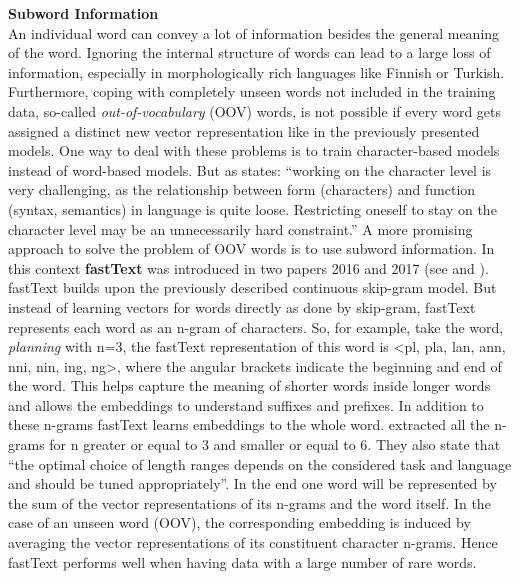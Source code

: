 \documentclass[]{krantz}
\begin{document}
\textbf{Subword Information}\\
An individual word can convey a lot of information besides the general meaning of the word. Ignoring the internal structure of words can lead to a large loss of information, especially in morphologically rich languages like Finnish or Turkish. Furthermore, coping with completely unseen words not included in the training data, so-called \emph{out-of-vocabulary} (OOV) words, is not possible if every word gets assigned a distinct new vector representation like in the previously presented models. One way to deal with these problems is to train character-based models instead of word-based models. But as \citet{goldberg2016primer} states: ``working on the character level is very challenging, as the relationship between form (characters) and function (syntax, semantics) in language is quite loose. Restricting oneself to stay on the character level may be an unnecessarily hard constraint.'' A more promising approach to solve the problem of OOV words is to use subword information. In this context \textbf{fastText} was introduced in two papers 2016 and 2017 (see \citet{joulin2016bag} and \citet{bojanowski2017enriching}). fastText builds upon the previously described continuous skip-gram model. But instead of learning vectors for words directly as done by skip-gram, fastText represents each word as an n-gram of characters. So, for example, take the word, \emph{planning} with n=3, the fastText representation of this word is \textless{}pl, pla, lan, ann, nni, nin, ing, ng\textgreater{}, where the angular brackets indicate the beginning and end of the word. This helps capture the meaning of shorter words inside longer words and allows the embeddings to understand suffixes and prefixes. In addition to these n-grams fastText learns embeddings to the whole word. \citet{bojanowski2017enriching} extracted all the n-grams for n greater or equal to 3 and smaller or equal to 6. They also state that ``the optimal choice of length ranges depends on the considered task and language and should be tuned appropriately''. In the end one word will be represented by the sum of the vector representations of its n-grams and the word itself. In the case of an unseen word (OOV), the corresponding embedding is induced by averaging the vector representations of its constituent character n-grams. Hence fastText performs well when having data with a large number of rare words.
\end{document}
